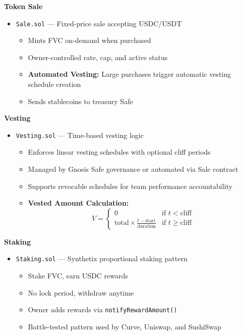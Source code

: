 \documentclass[
  paper=a4,
  ,captions=tableheading
]{scrartcl}
\newcommand{\passthrough}[1]{#1}
\providecommand{\tightlist}{%
  \setlength{\itemsep}{0pt}\setlength{\parskip}{0pt}}
\begin{document}
\textbf{Token Sale}

\begin{itemize}
\tightlist
\item
  \passthrough{\lstinline!Sale.sol!} --- Fixed-price sale accepting USDC/USDT
  \begin{itemize}
  \tightlist
  \item
    Mints FVC on-demand when purchased
  \item
    Owner-controlled rate, cap, and active status
  \item
    \textbf{Automated Vesting:} Large purchases trigger automatic vesting schedule creation
  \item
    Sends stablecoins to treasury Safe
  \end{itemize}
\end{itemize}

\textbf{Vesting}

\begin{itemize}
\tightlist
\item
  \passthrough{\lstinline!Vesting.sol!} --- Time-based vesting logic
  \begin{itemize}
  \tightlist
  \item
    Enforces linear vesting schedules with optional cliff periods
  \item
    Managed by Gnosis Safe governance or automated via Sale contract
  \item
    Supports revocable schedules for team performance accountability
  \item
    \textbf{Vested Amount Calculation:}
    \[
    V = \begin{cases} 
    0 & \text{if } t < \text{cliff} \\
    \text{total} \times \frac{t - \text{start}}{\text{duration}} & \text{if } t \geq \text{cliff}
    \end{cases}
    \]
  \end{itemize}
\end{itemize}

\textbf{Staking}

\begin{itemize}
\tightlist
\item
  \passthrough{\lstinline!Staking.sol!} --- Synthetix proportional staking pattern
  \begin{itemize}
  \tightlist
  \item
    Stake FVC, earn USDC rewards
  \item
    No lock period, withdraw anytime
  \item
    Owner adds rewards via \passthrough{\lstinline!notifyRewardAmount()!}
  \item
    Battle-tested pattern used by Curve, Uniswap, and SushiSwap
  \end{itemize}
\end{itemize}
\end{document}
